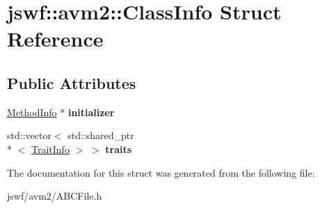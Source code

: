 \hypertarget{structjswf_1_1avm2_1_1_class_info}{\section{jswf\+:\+:avm2\+:\+:Class\+Info Struct Reference}
\label{structjswf_1_1avm2_1_1_class_info}
}
\subsection*{Public Attributes}
\begin{DoxyCompactItemize}
\item 
\hypertarget{structjswf_1_1avm2_1_1_class_info_ae91886322b2eedec321ecd9afbe733da}{\hyperlink{structjswf_1_1avm2_1_1_method_info}{Method\+Info} $\ast$ {\bfseries initializer}}\label{structjswf_1_1avm2_1_1_class_info_ae91886322b2eedec321ecd9afbe733da}

\item 
\hypertarget{structjswf_1_1avm2_1_1_class_info_aee121f21193215013f853e8c409d81f9}{std\+::vector$<$ std\+::shared\+\_\+ptr\\*
$<$ \hyperlink{structjswf_1_1avm2_1_1_trait_info}{Trait\+Info} $>$ $>$ {\bfseries traits}}\label{structjswf_1_1avm2_1_1_class_info_aee121f21193215013f853e8c409d81f9}

\end{DoxyCompactItemize}


The documentation for this struct was generated from the following file\+:\begin{DoxyCompactItemize}
\item 
jswf/avm2/A\+B\+C\+File.\+h\end{DoxyCompactItemize}
